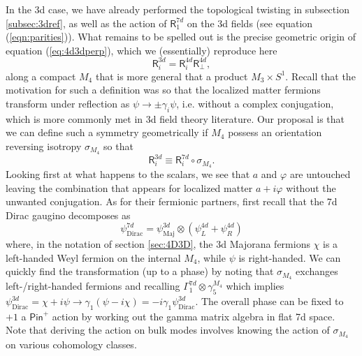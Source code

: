 \documentclass[12pt]{article}%
\numberwithin{equation}{section}
\renewcommand{\(}{\left(}
\renewcommand{\)}{\right)}
\renewcommand{\[}{\left[}
\renewcommand{\]}{\right]}
\begin{document}
In the 3d case, we have already performed the topological twisting in subsection \ref{subsec:3dref}, as well as the action of $\mathsf{R}^{7d}_1$ on the 3d fields (see equation (\ref{eqn:parities})). What remains to be spelled out is the precise geometric origin of equation (\ref{eq:4d3dperp}), which we (essentially) reproduce here
\begin{equation}
\mathsf{R}_{i}^{3d} = \mathsf{R}_{i}^{4d} \mathsf{R}_{\bot}^{4d},
\end{equation}
along a compact $M_4$ that is more general that a product $M_3\times S^1$. Recall that the motivation for such a definition was so that the localized matter fermions transform under reflection as $\psi\rightarrow \pm \gamma_i \psi$, i.e. without a complex conjugation, which is more commonly met in 3d field theory literature. Our proposal is that we can define such a symmetry geometrically if $M_4$ possess an orientation reversing isotropy $\sigma_{M_4}$ so that
\begin{equation}\label{3drefnocc}
\mathsf{R}^{3d}_i \equiv \mathsf{R}^{7d}_i \circ \sigma_{M_4}.
\end{equation}
Looking first at what happens to the scalars, we see that $a$ and $\varphi$ are untouched leaving the combination that appears for localized matter $a+i\varphi$ without the unwanted conjugation. As for their fermionic partners, first recall that the 7d Dirac gaugino decomposes as
\begin{equation}
\psi^{7d}_{\mathrm{Dirac}}=\psi^{3d}_{\mathrm{Maj}}\otimes (\psi^{4d}_{L}+\psi^{4d}_{R})
\end{equation}
where, in the notation of section \ref{sec:4D3D}, the 3d Majorana fermions $\chi$ is a left-handed Weyl fermion on the internal $M_4$, while $\psi$ is right-handed. We can quickly find the transformation (up to a phase) by noting that $\sigma_{M_4}$ exchanges left-/right-handed fermions and recalling $\Gamma^{7d}_1\otimes \gamma^{M_4}_5$ which implies $\psi^{3d}_{\mathrm{Dirac}}=\chi+i\psi\rightarrow \gamma_1(\psi-i\chi)=-i \gamma_1\psi^{3d}_{\mathrm{Dirac}}$. The overall phase can be fixed to $+1$ a $\mathsf{Pin}^+$ action by working out the gamma matrix algebra in flat 7d space. Note that deriving the action on bulk modes involves knowing the action of $\sigma_{M_4}$ on various cohomology classes.
\end{document}
